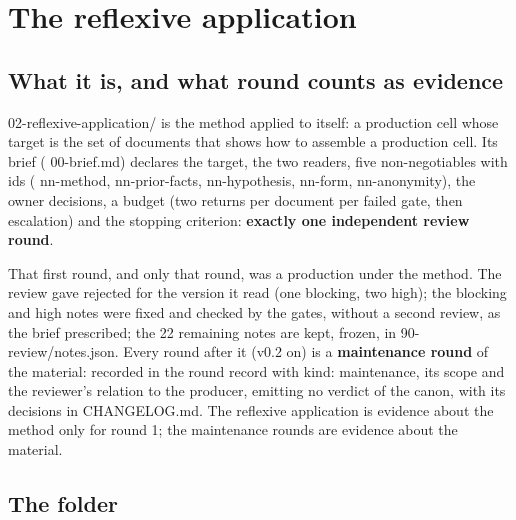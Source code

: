\documentclass[
  american,
  10pt,
]{report}
\renewcommand{\texttt}[1]{{\ttfamily\hyphenchar\font=-1 #1}}
\begin{document}
\chapter{The reflexive application}\label{the-reflexive-application}

\section{What it is, and what round counts as
evidence}\label{what-it-is-and-what-round-counts-as-evidence}

\texttt{02-\allowbreak{}reflexive-\allowbreak{}application/\allowbreak{}}
is the method applied to itself: a production cell whose target is the
set of documents that shows how to assemble a production cell. Its brief
(\texttt{00-\allowbreak{}brief.\allowbreak{}md}) declares the target,
the two readers, five non-negotiables with ids
(\texttt{nn-\allowbreak{}method},
\texttt{nn-\allowbreak{}prior-\allowbreak{}facts},
\texttt{nn-\allowbreak{}hypothesis}, \texttt{nn-\allowbreak{}form},
\texttt{nn-\allowbreak{}anonymity}), the owner decisions, a budget (two
returns per document per failed gate, then escalation) and the stopping
criterion: \textbf{exactly one independent review round}.

That first round, and only that round, was a production under the
method. The review gave \texttt{rejected} for the version it read (one
blocking, two high); the blocking and high notes were fixed and checked
by the gates, without a second review, as the brief prescribed; the 22
remaining notes are kept, frozen, in
\texttt{90-\allowbreak{}review/\allowbreak{}notes.\allowbreak{}json}.
Every round after it (v0.2 on) is a \textbf{maintenance round} of the
material: recorded in the round record with
\texttt{kind:\allowbreak{} maintenance}, its scope and the reviewer's
relation to the producer, emitting no verdict of the canon, with its
decisions in \texttt{CHANGELOG.\allowbreak{}md}. The reflexive
application is evidence about the method only for round 1; the
maintenance rounds are evidence about the material.

\section{The folder}\label{the-folder}
\end{document}
